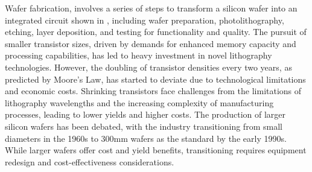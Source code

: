 Wafer fabrication, involves a series of steps to transform a silicon wafer into an integrated circuit shown in , including wafer preparation, photolithography, etching, layer deposition, and testing for functionality and quality. The pursuit of smaller transistor sizes, driven by demands for enhanced memory capacity and processing capabilities, has led to heavy investment in novel lithography technologies. However, the doubling of transistor densities every two years, as predicted by Moore's Law, has started to deviate due to technological limitations and economic costs. Shrinking transistors face challenges from the limitations of lithography wavelengths and the increasing complexity of manufacturing processes, leading to lower yields and higher costs. The production of larger silicon wafers has been debated, with the industry transitioning from small diameters in the 1960s to 300mm wafers as the standard by the early 1990s. While larger wafers offer cost and yield benefits, transitioning requires equipment redesign and cost-effectiveness considerations.


